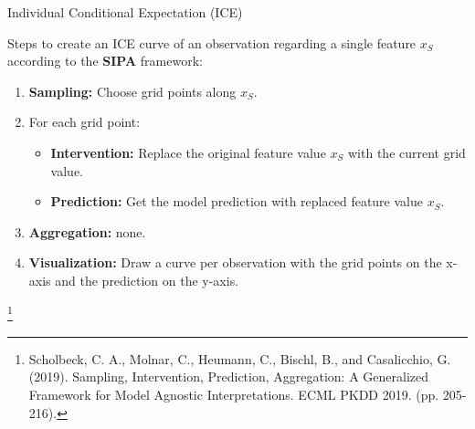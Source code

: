\documentclass[11pt,compress,t,notes=noshow, xcolor=table]{beamer}
\begin{document}
\begin{vbframe}{Individual Conditional Expectation (ICE)}

Steps to create an ICE curve of an observation regarding a single feature $x_S$ according to the \textbf{SIPA} framework:

\begin{enumerate}
\item \textbf{Sampling:} Choose grid points along $x_S$.
\item For each grid point:
\begin{itemize}
\item \textbf{Intervention:} Replace the original feature value $x_S$ with the current grid value.
\item \textbf{Prediction:} Get the model prediction with replaced feature value $x_S$.
\end{itemize}
\item \textbf{Aggregation:} none.
\item \textbf{Visualization:} Draw a curve per observation with the grid points on the x-axis and the prediction on the y-axis.
\end{enumerate}

\footnote[frame]{Scholbeck, C. A., Molnar, C., Heumann, C., Bischl, B., and Casalicchio, G. (2019). Sampling, Intervention, Prediction, Aggregation: A Generalized Framework for Model Agnostic Interpretations. ECML PKDD 2019. (pp. 205-216).}
\end{vbframe}
\end{document}
